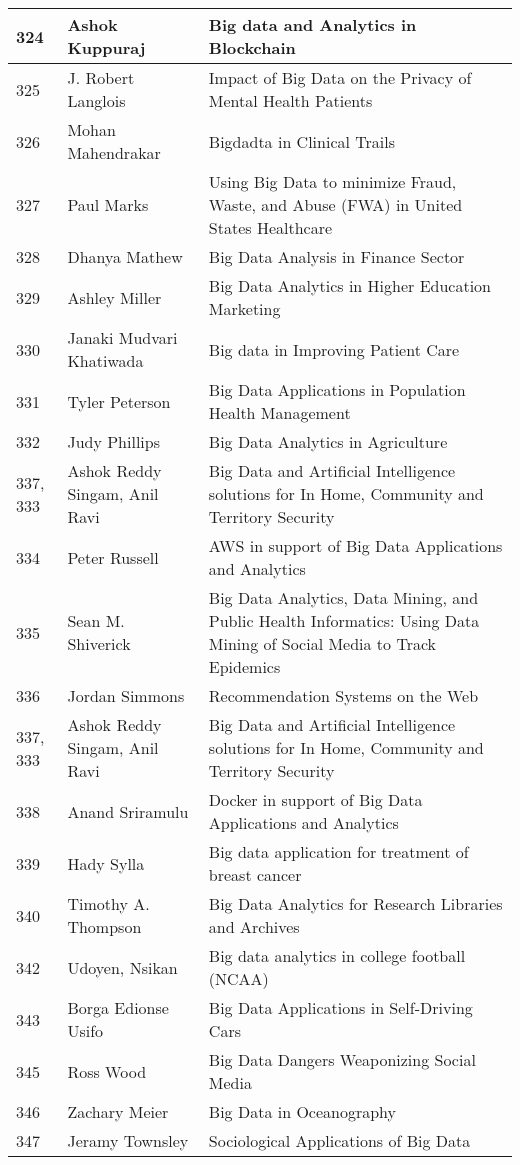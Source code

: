 \documentclass[12pt]{book}
\begin{document}
\begin{footnotesize}
\begin{longtable}{|p{1cm}p{5cm}p{9cm}|}
\hline
324 & Ashok Kuppuraj & Big data and Analytics in Blockchain  \\
\hline
325 & J. Robert Langlois & Impact of Big Data on the Privacy of Mental Health Patients  \\
\hline
326 & Mohan Mahendrakar & Bigdadta in Clinical Trails  \\
\hline
327 & Paul Marks & Using Big Data to minimize Fraud, Waste, and Abuse (FWA) in United States Healthcare
  \\
\hline
328 & Dhanya Mathew & Big Data Analysis in Finance Sector  \\
\hline
329 & Ashley Miller & Big Data Analytics in Higher Education Marketing  \\
\hline
330 & Janaki Mudvari Khatiwada & Big data in Improving Patient Care  \\
\hline
331 & Tyler Peterson & Big Data Applications in Population Health Management  \\
\hline
332 & Judy Phillips & Big Data Analytics in Agriculture  \\
\hline
337, 333 & Ashok Reddy Singam, Anil Ravi & Big Data and Artificial Intelligence solutions for In Home, Community and Territory Security
  \\
\hline
334 & Peter Russell & AWS in support of Big Data Applications and Analytics  \\
\hline
335 & Sean M. Shiverick & Big Data Analytics, Data Mining, and Public Health Informatics: Using Data Mining of Social Media to Track Epidemics
  \\
\hline
336 & Jordan Simmons & Recommendation Systems on the Web  \\
\hline
337, 333 & Ashok Reddy Singam, Anil Ravi & Big Data and Artificial Intelligence solutions for In Home, Community and Territory Security
  \\
\hline
338 & Anand Sriramulu & Docker in support of Big Data Applications and Analytics  \\
\hline
339 & Hady Sylla & Big data application for treatment of breast cancer  \\
\hline
340 & Timothy A. Thompson & Big Data Analytics for Research Libraries and Archives  \\
\hline
\hline
342 & Udoyen, Nsikan & Big data analytics in college football (NCAA)  \\
\hline
343 & Borga Edionse Usifo & Big Data Applications in Self-Driving Cars  \\
\hline
345 & Ross Wood & Big Data Dangers Weaponizing Social Media  \\
\hline
346 & Zachary Meier & Big Data in Oceanography  \\
\hline
347 & Jeramy Townsley & Sociological Applications of Big Data  \\
\hline
\hline
\end{longtable}
\end{footnotesize}
\newpage
\end{document}
